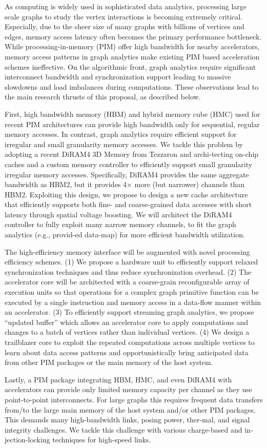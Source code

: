 \noindent
As computing is widely used in sophisticated data analytics, processing large scale graphs to study the vertex interactions is becoming extremely critical. 
Especially, due to the sheer size of many graphs with billions of vertices and edges, memory access latency often becomes the primary performance bottleneck. 
While processing-in-memory (PIM) offer high bandwidth for nearby accelerators, memory access patterns in graph analytics make existing PIM based acceleration schemes ineffective. 
On the algorithmic front, graph analytics require significant interconnect bandwidth and synchronization support leading to massive slowdowns and load imbalances during computations. 
These observations lead to the main research thrusts of this proposal, as described below.
 
First, high bandwidth memory (HBM) and hybrid memory cube (HMC) used for recent PIM architectures can provide high bandwidth only for sequential, regular memory accesses. 
In contrast, graph analytics require efficient support for irregular and small granularity memory accesses. 
We tackle this problem by adopting a recent DiRAM4 3D Memory from Tezzaron and archi-tecting on-chip caches and a custom memory controller to efficiently support small granularity irregular memory accesses. 
Specifically, DiRAM4 provides the same aggregate bandwidth as HBM2, but it provides 4× more (but narrower) channels than HBM2. 
Exploiting this design, we propose to design a new cache architecture that efficiently supports both fine- and coarse-grained data accesses with short latency through spatial voltage boosting. 
We will architect the DiRAM4 controller to fully exploit many narrow memory channels, to fit the graph analytics (e.g., provid-ed data-map) for more efficient bandwidth utilization.

The high-efficiency memory interface will be augmented with novel processing efficiency schemes. 
(1) We propose a hardware unit to efficiently support relaxed synchronization techniques and thus reduce synchronization overhead. 
(2) The accelerator core will be architected with a coarse-grain reconfigurable array of execution units so that operations for a complex graph primitive function can be executed by a single instruction and memory access in a data-flow manner within an accelerator. 
(3) To efficiently support streaming graph analytics, we propose “updated buffer” which allows an accelerator core to apply computations and changes to a batch of vertices rather than individual vertices. 
(4) We design a trailblazer core to exploit the repeated computations across multiple vertices to learn about data access patterns and opportunistically bring anticipated data from other PIM packages or the main memory of the host system.

Lastly, a PIM package integrating HBM, HMC, and even DiRAM4 with accelerators can provide only limited memory capacity per channel as they use point-to-point interconnects. 
For large graphs this requires frequent data transfers from/to the large main memory of the host system and/or other PIM packages. 
This demands many high-bandwidth links, posing power, ther-mal, and signal integrity challenges. 
We tackle this challenge with various charge-based and in-jection-locking techniques for high-speed links.

